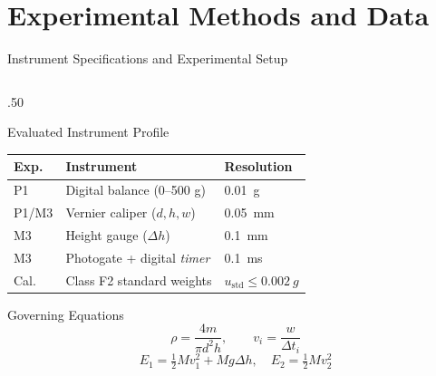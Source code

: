 \documentclass[aspectratio=169,10pt]{beamer}
\newcommand{\sm}{\fontsize{8.2}{10.2}\selectfont}
\newcommand{\xs}{\fontsize{7.1}{9}\selectfont}
\begin{document}
\section{Experimental Methods and Data}

\begin{frame}{Instrument Specifications and Experimental Setup}
\begin{columns}[T,onlytextwidth]
\begin{column}{.50\textwidth}
\begin{block}{Evaluated Instrument Profile}\xs
\begin{tabular}{@{}lll@{}}
\toprule
\textbf{Exp.} & \textbf{Instrument} & \textbf{Resolution}\\
\midrule
P1 & Digital balance (0--500 g) & \SI{0.01}{g}\\
P1/M3 & Vernier caliper ($d, h, w$) & \SI{0.05}{mm}\\
M3 & Height gauge ($\Delta h$) & \SI{0.1}{mm}\\
M3 & Photogate + digital \textit{timer} & \SI{0.1}{ms}\\
Cal. & Class F2 standard weights & $u_{\mathrm{std}} \le \SI{0.002}{g}$\\
\bottomrule
\end{tabular}
\end{block}
\begin{exampleblock}{Governing Equations}\sm
$$\rho = \frac{4m}{\pi d^2 h}, \qquad v_i = \frac{w}{\Delta t_i}$$
$$E_1 = \tfrac{1}{2}Mv_1^2 + Mg\Delta h, \quad E_2 = \tfrac{1}{2}Mv_2^2$$
\end{exampleblock}
\end{column}


\end{columns}
\end{frame}
\end{document}
